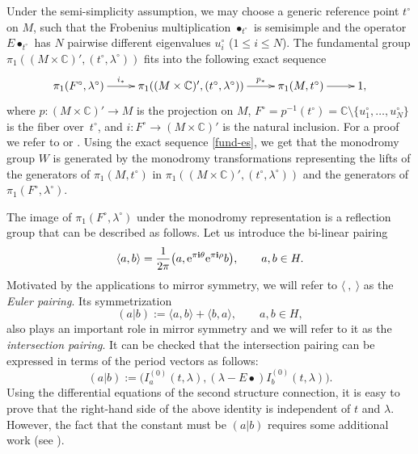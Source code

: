 \documentclass[pdftex]{sigma}
\numberwithin{equation}{section}
\newcommand{\CC}{\mathbb{C}}
\newcommand{\ii}{\mathbf{i}}
\begin{document}
Under the semi-simplicity
assumption, we may choose a generic reference point $t^\circ$ on $M$, such that
the Frobenius multiplication $\bullet_{t^\circ}$ is semisimple and the
operator $E\bullet_{t^\circ}$ has $N$ pairwise different eigenvalues
$u_i^\circ$ ($1\leq i\leq N$). The fundamental group $\pi_1((M\times
\CC)', (t^\circ,\lambda^\circ))$ fits into the following exact sequence
\begin{equation}\label{fund-es}
\xymatrix{
\pi_1(F^\circ,\lambda^\circ) \ar[r]^-{i_*} &
\pi_1((M\times \CC)', (t^\circ,\lambda^\circ) ) \ar[r]^-{p_*} &
\pi_1(M,t^\circ)\ar[r] &
1,}
\end{equation}
where $p\colon (M\times \CC)'\to M$ is the projection on $M$,
$F^\circ=p^{-1}(t^\circ)=\CC\setminus{\{u_1^\circ,\dots,u_N^\circ\}}$
is the fiber over~$t^\circ$, and
$i\colon F^\circ\to (M\times \CC)'$ is the natural inclusion. For a proof we refer to
\cite[Proposition~5.6.4]{Shimada:ln} or \cite[Lemma 1.5\,(C)]{Nori-zariski_conj}.
Using the exact sequence \eqref{fund-es}, we get that the monodromy
group $W$ is generated by the monodromy transformations
representing the lifts of the generators of $\pi_1(M,t^\circ)$ in
$\pi_1((M\times \CC)', (t^\circ, \lambda^\circ))$ and the
generators of $\pi_1(F^\circ,\lambda^\circ)$.

The image of $\pi_1(F^\circ,\lambda^\circ)$ under the monodromy
representation is a reflection group that can be described as
follows. Let us introduce the bi-linear pairing
\begin{equation}\label{euler-pairing}
\langle a,b\rangle = \frac{1}{2\pi}
\big( a, {\rm e}^{\pi\ii \theta} {\rm e}^{\pi\ii \rho} b\big),\qquad
a,b\in H.
\end{equation}
Motivated by the applications to mirror symmetry, we will refer to $\langle\ ,\ \rangle$ as the {\em Euler pairing}. Its symmetrization
\begin{equation}\label{inters-pairing:numerical}
(a|b):= \langle a, b\rangle + \langle b, a\rangle,\qquad a,b\in H,
\end{equation}
also plays an important role in mirror symmetry and we will refer to it as the {\em intersection pairing}. It can be checked that the intersection pairing can be expressed in terms of the period vectors as follows:
\[%
(a|b):=\big(I^{(0)}_a(t,\lambda),(\lambda-E\bullet)I^{(0)}_b(t,\lambda)\big).
\]
Using the differential equations of the second structure connection, it is
easy to prove that the right-hand side of the above identity is independent of $t$ and $\lambda$. However, the fact that the constant must be $(a|b)$ requires some additional work (see \cite{MilSa}).
\end{document}
